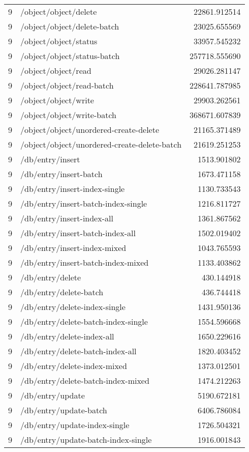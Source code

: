 \begin{longtable}{rlr}
9 & /object/object/delete & 22861.912514 \\
9 & /object/object/delete-batch & 23025.655569 \\
9 & /object/object/status & 33957.545232 \\
9 & /object/object/status-batch & 257718.555690 \\
9 & /object/object/read & 29026.281147 \\
9 & /object/object/read-batch & 228641.787985 \\
9 & /object/object/write & 29903.262561 \\
9 & /object/object/write-batch & 368671.607839 \\
9 & /object/object/unordered-create-delete & 21165.371489 \\
9 & /object/object/unordered-create-delete-batch & 21619.251253 \\
9 & /db/entry/insert & 1513.901802 \\
9 & /db/entry/insert-batch & 1673.471158 \\
9 & /db/entry/insert-index-single & 1130.733543 \\
9 & /db/entry/insert-batch-index-single & 1216.811727 \\
9 & /db/entry/insert-index-all & 1361.867562 \\
9 & /db/entry/insert-batch-index-all & 1502.019402 \\
9 & /db/entry/insert-index-mixed & 1043.765593 \\
9 & /db/entry/insert-batch-index-mixed & 1133.403862 \\
9 & /db/entry/delete & 430.144918 \\
9 & /db/entry/delete-batch & 436.744418 \\
9 & /db/entry/delete-index-single & 1431.950136 \\
9 & /db/entry/delete-batch-index-single & 1554.596668 \\
9 & /db/entry/delete-index-all & 1650.229616 \\
9 & /db/entry/delete-batch-index-all & 1820.403452 \\
9 & /db/entry/delete-index-mixed & 1373.012501 \\
9 & /db/entry/delete-batch-index-mixed & 1474.212263 \\
9 & /db/entry/update & 5190.672181 \\
9 & /db/entry/update-batch & 6406.786084 \\
9 & /db/entry/update-index-single & 1726.504321 \\
9 & /db/entry/update-batch-index-single & 1916.001843 \\

\end{longtable}
